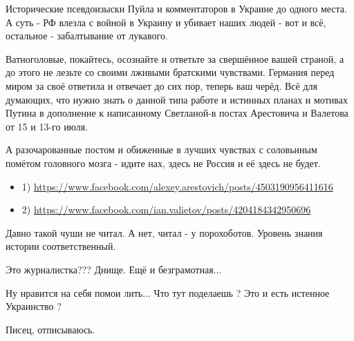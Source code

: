 \begin{itemize}
 

Исторические псевдоизыски Пуйла и комментаторов в Украине до одного места. А
суть - РФ влезла с войной в Украину и убивает наших людей - вот и всё,
остальное - забалтывание от лукавого. 

Ватноголовые, покайтесь, осознайте и ответьте за свершённое вашей страной, а до
этого не лезьте со своими лживыми братскими чувствами. Германия перед миром за
своё ответила и отвечает до сих пор, теперь ваш черёд. Всё для думающих, что
нужно знать о данной типа работе и истинных планах и мотивах Путина в
дополнение к написанному Светланой-в постах Арестовича и Валетова от 15 и 13-го
июля. 

А разочарованные постом и обиженные в лучших чувствах с соловьиным помётом
головного мозга - идите нах, здесь не Россия и её здесь не будет. 

\begin{itemize}
  \item 1) \url{https://www.facebook.com/alexey.arestovich/posts/4503190956411616} 
  \item 2) \url{https://www.facebook.com/ian.valietov/posts/4204184342950696}
\end{itemize}

 
Давно такой чуши не читал. А нет, читал - у порохоботов. Уровень знания истории соответственный.

 
Это журналистка??? Днище. Ещё и безграмотная...

 
Ну нравится на себя помои лить... Что тут поделаешь ? Это и есть истенное Украинство ?

 
Писец, отписываюсь.



\end{itemize}

